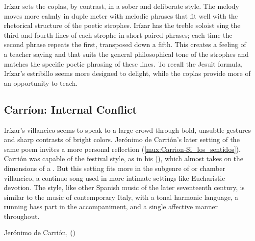 Irízar sets the coplas, by contrast, in a sober and deliberate style.
The melody moves more calmly in duple meter with melodic phrases that fit well
with the rhetorical structure of the poetic strophes.  
Irízar has the treble soloist sing the third and fourth lines of each strophe in
short paired phrases; each time the second phrase repeats the first, transposed
down a fifth.
This creates a feeling of a teacher saying  and
 that suits the general philosophical tone of the
strophes and matches the specific poetic phrasing of these lines.
To recall the Jesuit formula, Irízar's estribillo seems more designed to
delight, while the coplas provide more of an opportunity to teach.

\subsection{Carríon: Internal Conflict}

Irízar's villancico seems to speak to a large crowd through bold, unsubtle
gestures and sharp contrasts of bright colors.
Jerónimo de Carrión's later setting of the same poem invites a more personal
reflection (\cref{mux:Carrion-Si_los_sentidos}).%
    \Autocite[149--152]{Cashner:WLSCM32}
Carrión was capable of the festival style, as in his  (), which almost takes on the dimensions of a
.  
But this setting fits more in the subgenre of  or chamber
villancico, a continuo song used in more intimate settings like Eucharistic
devotion.%
    \Autocite[See, for example][]{Robledo:MadridTonos}
The style, like other Spanish music of the later seventeenth century, is
similar to the  music of contemporary Italy, with a tonal
harmonic language, a running bass part in the accompaniment, and a single
affective manner throughout.

{Jerónimo de Carrión, 
()}

